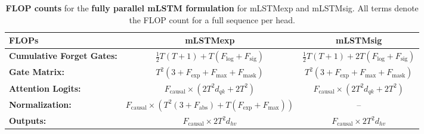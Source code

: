 \documentclass{article}
\begin{document}
    \begin{table}[htbp]
        \vspace{-0.3cm}
        \centering
        \caption{\label{tab:flop_counts_mlstm_parallel} \textbf{FLOP counts} for the \textbf{fully parallel mLSTM formulation} for mLSTMexp and mLSTMsig.
            All terms denote the FLOP count for a full sequence per head.}
        \vspace{0.2cm}
        \begin{adjustbox}{width=\textwidth}
        \begin{tabular}{lcc}
            \toprule
            FLOPs                             & mLSTMexp                                                                                      & mLSTMsig                                                   \\
            \midrule
            \textbf{Cumulative Forget Gates:} & $\frac{1}{2} T (T + 1) + T (F_\text{log} + F_\text{sig})$                                     & $\frac{1}{2} T (T + 1) + 2T (F_\text{log} + F_\text{sig})$ \\
            \textbf{Gate Matrix:}             & $T^2 (3 + F_\text{exp} + F_\text{max} + F_\text{mask})$                                       & $T^2 (3 + F_\text{exp} + F_\text{max} + F_\text{mask})$    \\
            \textbf{Attention Logits:}        & $F_\text{causal} \times \left( 2T^2d_{qk} + 2T^2 \right)$                                     & $F_\text{causal} \times \left( 2T^2d_{qk} + 2T^2 \right)$  \\
            \textbf{Normalization:}           & $F_\text{causal} \times \left( T^2 (3 + F_\text{abs}) + T(F_\text{exp}+F_\text{max}) \right)$ & --                                                         \\
            \textbf{Outputs:}                 & $F_\text{causal} \times 2 T^2 d_{hv}$                                                         & $F_\text{causal} \times 2 T^2 d_{hv}$                      \\
            \bottomrule
        \end{tabular}
        \end{adjustbox}
        \vspace{-0.2cm}
    \end{table}
\end{document}
